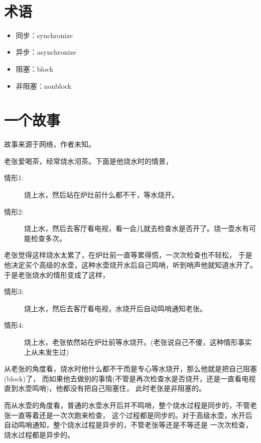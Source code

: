 \documentclass[a4paper,11pt]{article}
\begin{document}
\tt %
\pagestyle{header}
\sybmaketitle
\newpage

\pagestyle{main}
\setcounter{page}{1}

\section[术语]{术语}
\begin{itemize}
  \item 同步：synchronize
  \item 异步：asynchronize
  \item 阻塞：block
  \item 非阻塞：nonblock
\end{itemize}

\section[一个故事]{一个故事}
故事来源于网络，作者未知。

老张爱喝茶，经常烧水沏茶。下面是他烧水时的情景，
\begin{description}
  \item[情形1: ] 烧上水，然后站在炉灶前什么都不干，等水烧开。
  \item[情形2: ] 烧上水，然后去客厅看电视，看一会儿就去检查水是否开了。烧一壶水有可能检查多次。
\end{description}
老张觉得这样烧水太累了，在炉灶前一直等累得慌，一次次检查也不轻松，
于是他决定买个高级的水壶，这种水壶烧开水后自己鸣哨，听到哨声他就知道水开了。
于是老张烧水的情形变成了这样，
\begin{description}
  \item[情形3: ] 烧上水，然后去客厅看电视，水烧开后自动鸣哨通知老张。
  \item[情形4: ] 烧上水，老张依然站在炉灶前等水烧开。(老张说自己不傻，这种情形事实上从未发生过)
\end{description}
从老张的角度看，烧水时他什么都不干而是专心等水烧开，那么他就是把自己阻塞(block)了，
而如果他去做别的事情(不管是再次检查水是否烧开，还是一直看电视直到水壶鸣哨)，他都没有把自己阻塞住，
此时老张是非阻塞的。

而从水壶的角度看，普通的水壶水开后并不鸣哨，整个烧水过程是同步的，不管老张一直等着还是一次次跑来检查，
这个过程都是同步的。对于高级水壶，水开后自动鸣哨通知，整个烧水过程是异步的，不管老张等还是不等还是
一次次检查，烧水过程都是异步的。
\end{document}
